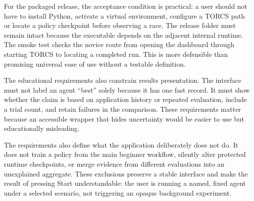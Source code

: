 For the packaged release, the acceptance condition is practical: a user should not have to install Python, activate a virtual environment, configure a TORCS path or locate a policy checkpoint before observing a race. The release folder must remain intact because the executable depends on the adjacent internal runtime. The smoke test checks the novice route from opening the dashboard through starting TORCS to locating a completed run. This is more defensible than promising universal ease of use without a testable definition.

The educational requirements also constrain results presentation. The interface must not label an agent \enquote{best} solely because it has one fast record. It must show whether the claim is based on application history or repeated evaluation, include a trial count, and retain failures in the comparison. These requirements matter because an accessible wrapper that hides uncertainty would be easier to use but educationally misleading.

The requirements also define what the application deliberately does not do. It does not train a policy from the main beginner workflow, silently alter protected runtime checkpoints, or merge evidence from different evaluations into an unexplained aggregate. These exclusions preserve a stable interface and make the result of pressing Start understandable: the user is running a named, fixed agent under a selected scenario, not triggering an opaque background experiment.

